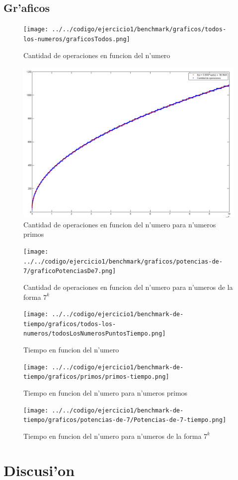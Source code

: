 \subsection{Gr'aficos}
\begin{figure}[H]
\centering
\texttt{[image: ../../codigo/ejercicio1/benchmark/graficos/todos-los-numeros/graficosTodos.png]}
\caption{Cantidad de operaciones en funcion del n'umero}
\end{figure}

\begin{figure}[H]
\centering
\includegraphics[scale=0.5]{../../codigo/ejercicio1/benchmark/graficos/primos/graficoPrimos.png}
\caption{Cantidad de operaciones en funcion del n'umero para n'umeros primos}
\end{figure}

\begin{figure}[H]
\centering
\texttt{[image: ../../codigo/ejercicio1/benchmark/graficos/potencias-de-7/graficoPotenciasDe7.png]}
\caption{Cantidad de operaciones en funcion del n'umero para n'umeros de la forma $7^k$}
\end{figure}

\begin{figure}[H]
\centering
\texttt{[image: ../../codigo/ejercicio1/benchmark-de-tiempo/graficos/todos-los-numeros/todosLosNumerosPuntosTiempo.png]}
\caption{Tiempo en funcion del n'umero}
\end{figure}

\begin{figure}[H]
\centering
\texttt{[image: ../../codigo/ejercicio1/benchmark-de-tiempo/graficos/primos/primos-tiempo.png]}
\caption{Tiempo en funcion del n'umero para n'umeros primos}
\end{figure}

\begin{figure}[H]
\centering
\texttt{[image: ../../codigo/ejercicio1/benchmark-de-tiempo/graficos/potencias-de-7/Potencias-de-7-tiempo.png]}
\caption{Tiempo en funcion del n'umero para n'umeros de la forma $7^k$}
\end{figure}

\section{Discusi'on}


